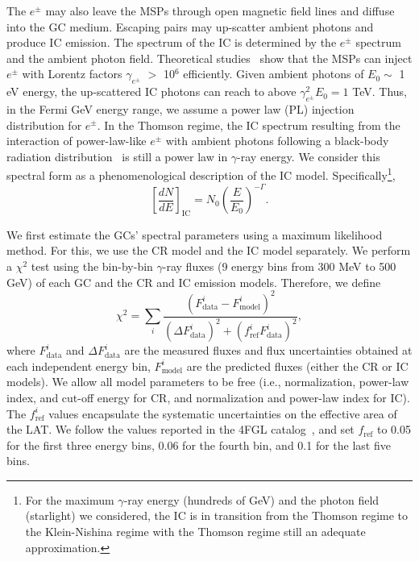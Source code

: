 \documentclass[doublespace,nopageskip]{VTthesis} %
\begin{document}
The $e^\pm$ may also leave the MSPs through open magnetic field lines and diffuse into the GC medium. Escaping pairs may up-scatter ambient photons and produce IC emission. The spectrum of the IC is determined by the $e^\pm$ spectrum and the ambient photon field. Theoretical studies~\citep{2011ApJ...743..181H} show that the MSPs can inject $e^\pm$ with Lorentz factors $\gamma_{e^\pm}$ $>$ 10$^6$ efficiently. Given ambient photons of $ E_0\sim$ 1 eV energy, the up-scattered IC photons can reach to above $\gamma_{e^\pm}^2 E_0 = 1$ TeV. Thus, in the Fermi GeV energy range, we assume a power law (PL) injection distribution for $e^\pm$. In the Thomson regime, the IC spectrum resulting from the interaction of power-law-like $e^\pm$ with ambient photons following a black-body radiation distribution~\citep{1970RvMP...42..237B} is still a power law in $\gamma$-ray energy. We consider this spectral form as a phenomenological description of the IC model. Specifically\footnote{For the maximum $\gamma$-ray energy (hundreds of GeV) and the photon field (starlight) we considered, the IC is in transition from the Thomson regime to the Klein-Nishina regime with the Thomson regime still an adequate approximation.},
\begin{equation}\label{eq:PL}
    \left[ \frac{dN}{dE} \right]_{\mathrm{IC}} = N_0 \left(\frac{E}{E_0} \right)^{-\Gamma}.
\end{equation}

We first estimate the GCs' spectral parameters using a maximum likelihood method. For this, we use the CR model and the IC model separately. We perform a $\chi^2$ test using the bin-by-bin $\gamma$-ray fluxes (9 energy bins from 300 MeV to 500 GeV) of each GC and the CR and IC emission models. Therefore, we define 
\begin{equation}
    \chi^2=\sum_i\frac{(F_\text{data}^i-F_\text{model}^i)^2}{(\Delta F_\text{data}^i)^2+(f_\text{ref}^i F_\text{data}^i)^2},
\end{equation}
where $F_\mathrm{data}^i$ and $\Delta F_\mathrm{data}^i$ are the measured fluxes and flux uncertainties obtained at each independent energy bin,  $F_\mathrm{model}^i$ are the predicted fluxes (either the CR or IC models). We allow all model parameters to be free (i.e., normalization, power-law index, and cut-off energy for CR, and normalization and power-law index for IC). The $f_\text{ref}^i$ values encapsulate the systematic uncertainties on the effective area of the LAT. We follow the values reported in the 4FGL catalog~\citep{2020ApJS..247...33A}, and set $f_\text{ref}$ to 0.05 for the first three energy bins, 0.06 for the fourth bin, and 0.1 for the last five bins.
\end{document}
